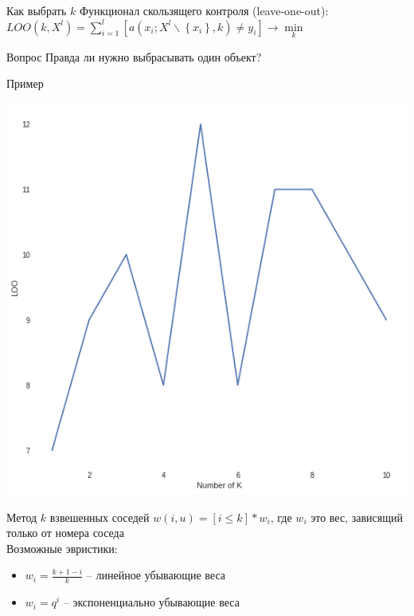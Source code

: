 \documentclass[10pt]{beamer}
\begin{document}
\begin{frame}{Как выбрать $k$}
	Функционал скользящего контроля (leave-one-out):\\
	\bigbreak
	${LOO(k, X^l) = \sum\limits_{i=1}^l [a(x_i; X^l \backslash \left\{x_i\right\}, k) \neq y_i] \rightarrow \min\limits_k}$\\
\end{frame}

\begin{frame}{Вопрос}
  \centering
	Правда ли нужно выбрасывать один объект?
\end{frame}

\begin{frame}{Пример}
	\begin{center}
	  \includegraphics[width=\textwidth, height=0.8 \textheight, keepaspectratio]{images/loo}
	\end{center}
\end{frame}

\begin{frame}{Метод $k$ взвешенных соседей}
  \bigbreak
	${w(i,u) = [i \leq k] * w_i}$, где $w_i$ это вес, зависящий только от номера соседа\\
	\bigbreak
	Возможные эвристики:\\	

	\begin{itemize} [<+->]
	\item ${w_i = \frac{k+1-i}{k}}$ -- линейное убывающие веса\\ %
	\item ${w_i = q^i}$ -- экспоненциально убывающие веса\\
	\end{itemize}
\end{frame}
\end{document}
